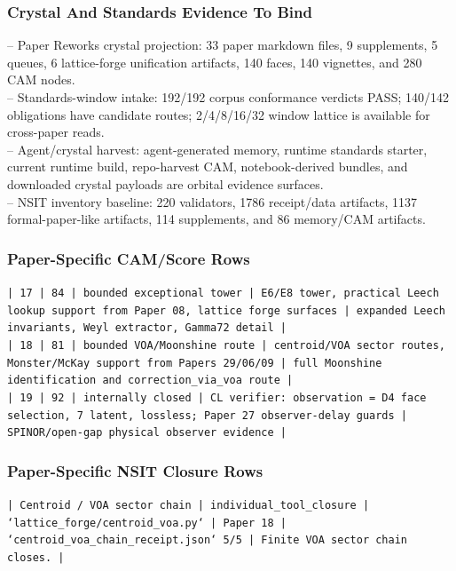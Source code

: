 \documentclass[11pt]{article}
\begin{document}
\subsubsection*{Crystal And Standards Evidence To Bind}

\noindent{}-- Paper Reworks crystal projection: 33 paper markdown files, 9 supplements, 5 queues, 6 lattice-forge unification artifacts, 140 faces, 140 vignettes, and 280 CAM nodes.\\
\noindent{}-- Standards-window intake: 192/192 corpus conformance verdicts PASS; 140/142 obligations have candidate routes; 2/4/8/16/32 window lattice is available for cross-paper reads.\\
\noindent{}-- Agent/crystal harvest: agent-generated memory, runtime standards starter, current runtime build, repo-harvest CAM, notebook-derived bundles, and downloaded crystal payloads are orbital evidence surfaces.\\
\noindent{}-- NSIT inventory baseline: 220 validators, 1786 receipt/data artifacts, 1137 formal-paper-like artifacts, 114 supplements, and 86 memory/CAM artifacts.\\

\subsubsection*{Paper-Specific CAM/Score Rows}

\noindent\texttt{| 17 | 84 | bounded exceptional tower | E6/E8 tower, practical Leech lookup support from Paper 08, lattice forge surfaces | expanded Leech invariants, Weyl extractor, Gamma72 detail |}\\
\noindent\texttt{| 18 | 81 | bounded VOA/Moonshine route | centroid/VOA sector routes, Monster/McKay support from Papers 29/06/09 | full Moonshine identification and correction\_via\_voa route |}\\
\noindent\texttt{| 19 | 92 | internally closed | CL verifier: observation = D4 face selection, 7 latent, lossless; Paper 27 observer-delay guards | SPINOR/open-gap physical observer evidence |}\\

\subsubsection*{Paper-Specific NSIT Closure Rows}

\noindent\texttt{| Centroid / VOA sector chain | individual\_tool\_closure | `lattice\_forge/centroid\_voa.py` | Paper 18 | `centroid\_voa\_chain\_receipt.json` 5/5 | Finite VOA sector chain closes. |}\\
\end{document}
